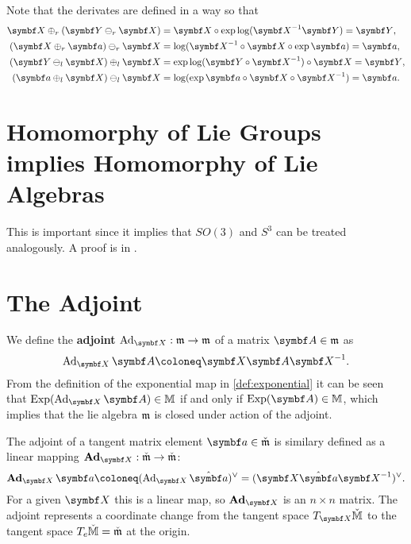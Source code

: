 Note that the derivates are defined in a way so that
\begin{subequations}
  \begin{align}
    \X \oplus_r (\Y \ominus_r \X ) & = \X \circ \exp \log (\X^{-1} \Y) = \Y,                                     \\
    (\X \oplus_r \a) \ominus_r \X  & = \log (\X^{-1} \circ \X \circ \exp \a) = \a,   \label{eq:x_plus_a_minus_x} \\
    (\Y \ominus_l \X ) \oplus_l \X & = \exp \log (\Y \circ \X^{-1}) \circ \X = \Y,                               \\
    (\a \oplus_l \X) \ominus_l \X  & = \log (\exp \a \circ \X \circ \X^{-1}) = \a.
  \end{align}
\end{subequations}


\section{Homomorphy of Lie Groups implies Homomorphy of Lie Algebras}

This is important since it implies that $SO(3)$ and $S^3$ can be treated analogously. A proof is in \cite[Corr. 20]{howe_very_1983}.

\section{The Adjoint}

We define the \textbf{adjoint} $\Ad_\X : \lM \rightarrow \lM$ of a matrix $\A \in \lM$ as
\begin{equation}
  \Ad_{\X} \A \coloneq \X \A \X^{-1}.
\end{equation}
From the definition of the exponential map in \eqref{def:exponential} it can be seen that $\Exp( \Ad_\X \A) \in \M$ if and only if $\Exp (\A) \in \M$, which implies that the lie algebra $\mathfrak{m}$ is closed under action of the adjoint.

The adjoint of a tangent matrix element $\a \in \clM$ is similary defined as a linear mapping $\bAd_\X : \clM \rightarrow \clM$:
\begin{equation}
  \label{eq:def_bad}
  \bAd_\X \a \coloneq (\Ad_{\X} \hat \a)^\vee = (\X \hat \a \X^{-1})^\vee.
\end{equation}
For a given $\X$ this is a linear map, so $\bAd_\X$ is an $n \times n$ matrix. The adjoint represents a coordinate change from the tangent space $T_\X \cM$ to the tangent space $T_e \check{\mathbb{M}} = \check{\mathfrak{m}}$ at the origin.


